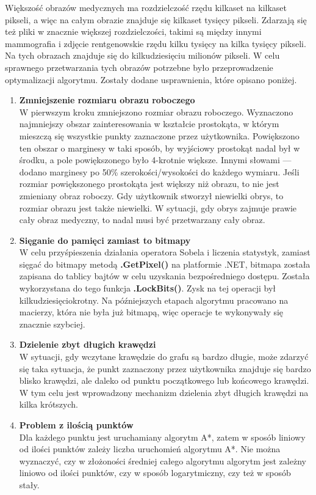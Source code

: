 \documentclass[a4paper,11pt,twoside,openright]{report}
\theoremstyle{definition}
\begin{document}
Większość obrazów medycznych ma rozdzielczość rzędu kilkaset na kilkaset pikseli,
a więc na całym obrazie znajduje się kilkaset tysięcy pikseli. Zdarzają się też
pliki w znacznie większej rozdzielczości, takimi są między innymi mammografia i
zdjęcie rentgenowskie rzędu kilku tysięcy na kilka tysięcy pikseli.
Na tych obrazach znajduje się do kilkudziesięciu milionów
pikseli. W celu sprawnego przetwarzania tych obrazów potrzebne było przeprowadzenie optymalizacji
algorytmu. Zostały dodane usprawnienia, które opisano poniżej.
\begin{enumerate}
\item \textbf {Zmniejszenie rozmiaru obrazu roboczego} \\
W pierwszym kroku zmniejszono rozmiar obrazu roboczego. Wyznaczono najmniejszy obszar zainteresowania w kształcie
prostokąta, w którym mieszczą się wszystkie punkty zaznaczone przez użytkownika.
Powiększono ten obszar o marginesy w taki sposób, by wyjściowy prostokąt nadal
był w środku, a pole powiększonego było 4-krotnie większe. Innymi słowami ---
dodano marginesy po 50\% szerokości/wysokości do każdego wymiaru. Jeśli rozmiar
powiększonego prostokąta jest większy niż obrazu, to nie jest zmieniany obraz roboczy.
Gdy użytkownik stworzył niewielki obrys, to rozmiar obrazu jest także niewielki.
W sytuacji, gdy obrys zajmuje prawie cały obraz medyczny, to nadal musi być
przetwarzany cały obraz.
\item \textbf {Sięganie do pamięci zamiast to bitmapy} \\
W celu przyśpieszenia działania operatora Sobela i liczenia statystyk, zamiast
sięgać do bitmapy metodą \textbf{.GetPixel()} na platformie .NET, bitmapa została zapisana
do tablicy bajtów w celu uzyskania bezpośredniego dostępu. Została wykorzystana do tego
funkcja \textbf{.LockBits()}. Zysk na tej operacji był kilkudziesięciokrotny. Na późniejszych
etapach algorytmu pracowano na macierzy, która nie była już bitmapą, więc operacje
te wykonywały się znacznie szybciej.
\item \textbf {Dzielenie zbyt długich krawędzi} \\
W sytuacji, gdy wczytane krawędzie do grafu są bardzo długie, może zdarzyć się
taka sytuacja, że punkt zaznaczony przez użytkownika znajduje się bardzo blisko
krawędzi, ale daleko od punktu początkowego lub końcowego krawędzi. W tym celu
jest wprowadzony mechanizm dzielenia zbyt długich krawędzi na kilka krótszych.
\item \textbf {Problem z ilością punktów} \\
Dla każdego punktu jest uruchamiany algorytm A*, zatem w sposób liniowy od ilości
punktów zależy liczba uruchomień algorytmu A*. Nie można wyznaczyć, czy w złożoności
średniej całego algorytmu algorytm jest zależny liniowo od ilości punktów, czy
w sposób logarytmiczny, czy też w sposób stały.
\end{enumerate}
\end{document}
